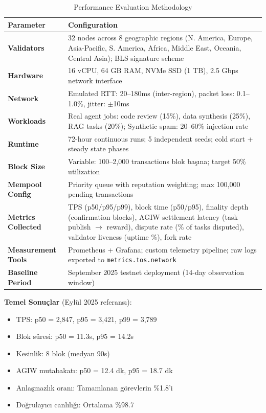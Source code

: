 \documentclass[11pt]{article}
\begin{document}
\begin{itemize}[noitemsep]
\begin{itemize}[noitemsep]
\begin{itemize}[noitemsep]
\begin{table}[H]
\centering
\caption{Performance Evaluation Methodology}
\label{tab:evaluation-methodology}
\begin{tabular}{@{}p{}p{}@{}}
\toprule
\textbf{Parameter} & \textbf{Configuration} \\ \midrule
\textbf{Validators} & 32 nodes across 8 geographic regions (N. America, Europe, Asia-Pacific, S. America, Africa, Middle East, Oceania, Central Asia); BLS signature scheme \\
\textbf{Hardware} & 16 vCPU, 64 GB RAM, NVMe SSD (1 TB), 2.5 Gbps network interface \\
\textbf{Network} & Emulated RTT: 20--180ms (inter-region), packet loss: 0.1--1.0\%, jitter: $\pm$10ms \\
\textbf{Workloads} & Real agent jobs: code review (15\%), data synthesis (25\%), RAG tasks (20\%); Synthetic spam: 20--60\% injection rate \\
\textbf{Runtime} & 72-hour continuous runs; 5 independent seeds; cold start + steady state phases \\
\textbf{Block Size} & Variable: 100--2,000 transactions blok başına; target 50\% utilization \\
\textbf{Mempool Config} & Priority queue with reputation weighting; max 100,000 pending transactions \\
\textbf{Metrics Collected} & TPS (p50/p95/p99), block time (p50/p95), finality depth (confirmation blocks), AGIW settlement latency (task publish $\rightarrow$ reward), dispute rate (\% of tasks disputed), validator liveness (uptime \%), fork rate \\
\textbf{Measurement Tools} & Prometheus + Grafana; custom telemetry pipeline; raw logs exported to \texttt{metrics.tos.network} \\
\textbf{Baseline Period} & September 2025 testnet deployment (14-day observation window) \\
\bottomrule
\end{tabular}
\end{table}

\textbf{Temel Sonuçlar} (Eylül 2025 referansı):
\begin{itemize}[noitemsep]
  \item TPS: p50 = 2,847, p95 = 3,421, p99 = 3,789
  \item Blok süresi: p50 = 11.3s, p95 = 14.2s
  \item Kesinlik: 8 blok (medyan 90s)
  \item AGIW mutabakatı: p50 = 12.4 dk, p95 = 18.7 dk
  \item Anlaşmazlık oranı: Tamamlanan görevlerin \%1.8'i
  \item Doğrulayıcı canlılığı: Ortalama \%98.7
\end{itemize}


\end{itemize}
\end{itemize}
\end{itemize}
\end{document}
